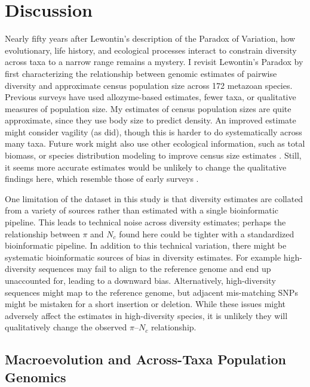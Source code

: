 \documentclass[11pt]{article}
\begin{document}
\section*{Discussion}

Nearly fifty years after Lewontin's description of the Paradox of Variation,
how evolutionary, life history, and ecological processes interact to constrain
diversity across taxa to a narrow range remains a mystery. I revisit Lewontin's
Paradox by first characterizing the relationship between genomic estimates of
pairwise diversity and approximate census population size across 172 metazoan
species. Previous surveys have used allozyme-based estimates, fewer taxa, or
qualitative measures of population size. My estimates of census population
sizes are quite approximate, since they use body size to predict density. An
improved estimate might consider vagility (as \cite{Soule1976-he} did), though
this is harder to do systematically across many taxa. Future work might also
use other ecological information, such as total biomass, or species
distribution modeling to improve census size estimates
\parencite{Bar-On2018-kc, Mora2011-wm}.  Still, it seems more accurate
estimates would be unlikely to change the qualitative findings here, which
resemble those of early surveys \parencite{Nei1984-zi,Soule1976-he}.

One limitation of the dataset in this study is that diversity estimates are
collated from a variety of sources rather than estimated with a single
bioinformatic pipeline. This leads to technical noise across diversity
estimates; perhaps the relationship between $\pi$ and $N_c$ found here could be
tighter with a standardized bioinformatic pipeline. In addition to this
technical variation, there might be systematic bioinformatic sources of bias in
diversity estimates. For example high-diversity sequences may fail to align to
the reference genome and end up unaccounted for, leading to a downward bias.
Alternatively, high-diversity sequences might map to the reference genome, but
adjacent mis-matching SNPs might be mistaken for a short insertion or deletion.
While these issues might adversely affect the estimates in high-diversity
species, it is unlikely they will qualitatively change the observed
$\pi$--$N_c$ relationship.

\subsection*{Macroevolution and Across-Taxa Population Genomics}
\end{document}
